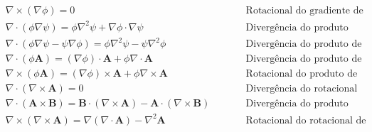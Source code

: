 $$
    \begin{aligned}
        &\nabla \times (\nabla \phi) = 0 
        & &\qquad \text{Rotacional do gradiente de um campo escalar é zero.}
        \\
        &\nabla \cdot (\phi \nabla \psi) = \phi \nabla^2 \psi + \nabla \phi \cdot \nabla \psi
        & &\qquad \text{Divergência do produto escalar por gradiente.}
        \\
        &\nabla \cdot (\phi \nabla \psi - \psi \nabla \phi) = \phi \nabla^2 \psi - \psi \nabla^2 \phi
        & &\qquad \text{Divergência do produto de gradientes escalares.}
        \\
        &\nabla \cdot (\phi \mathbf{A}) = (\nabla \phi) \cdot \mathbf{A} + \phi \nabla \cdot \mathbf{A}
        & &\qquad \text{Divergência do produto de um escalar por um vetor.}
        \\
        &\nabla \times (\phi \mathbf{A}) = (\nabla \phi) \times \mathbf{A} + \phi \nabla \times \mathbf{A}
        & &\qquad \text{Rotacional do produto de um escalar por um vetor.}
        \\
        &\nabla \cdot (\nabla \times \mathbf{A}) = 0
        & &\qquad \text{Divergência do rotacional de um vetor é zero.}
        \\
        &\nabla \cdot (\mathbf{A} \times \mathbf{B}) = \mathbf{B} \cdot (\nabla \times \mathbf{A}) - \mathbf{A} \cdot (\nabla \times \mathbf{B})
        & &\qquad \text{Divergência do produto vetorial.}
        \\
        &\nabla \times (\nabla \times \mathbf{A}) = \nabla (\nabla \cdot \mathbf{A}) - \nabla^2 \mathbf{A}
        & &\qquad \text{Rotacional do rotacional de um vetor.}
    \end{aligned}
$$
